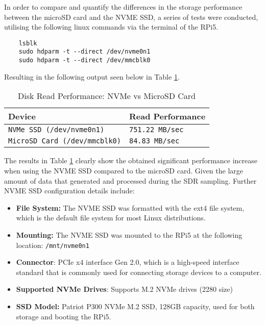 In order to compare and quantify the differences in the storage performance between the microSD card and the NVME SSD, a series of tests were conducted, utilising the following linux commands via the terminal of the RPi5.

\begin{verbatim}
    lsblk
    sudo hdparm -t --direct /dev/nvme0n1 
    sudo hdparm -t --direct /dev/mmcblk0
\end{verbatim}

\noindent Resulting in the following output seen below in Table \ref{tab:diskperf}.

\begin{table}[h!]
    \centering
    \caption{Disk Read Performance: NVMe vs MicroSD Card \label{tab:diskperf}}
    \begin{tabular}{|l|l|}
    \hline
    \textbf{Device} & \textbf{Read Performance} \\ \hline
    \texttt{NVMe SSD (\texttt{/dev/nvme0n1})} & \texttt{751.22 MB/sec} \\ \hline
    \texttt{MicroSD Card (\texttt{/dev/mmcblk0})} & \texttt{84.83 MB/sec} \\ \hline
    \end{tabular}
\end{table}

The results in Table \ref{tab:diskperf} clearly show the obtained significant performance increase when using the NVME SSD compared to the microSD card. Given the large amount of data that generated and processed during the SDR sampling. Further NVME SSD configuration details include: 

\begin{itemize}
    \item \textbf{File System:} The NVME SSD was formatted with the ext4 file system, which is the default file system for most Linux distributions. 
    \item \textbf{Mounting:} The NVME SSD was mounted to the RPi5 at the following location: \texttt{/mnt/nvme0n1}
    \item \textbf{Connector}: PCIe x4 interface Gen 2.0, which is a high-speed interface standard that is commonly used for connecting storage devices to a computer.
    \item \textbf{Supported NVMe Drives}: Supports M.2 NVMe drives (2280 size)
    \item \textbf{SSD Model:} Patriot P300 NVMe M.2 SSD, 128GB capacity, used for both storage and booting the RPi5.
\end{itemize}


